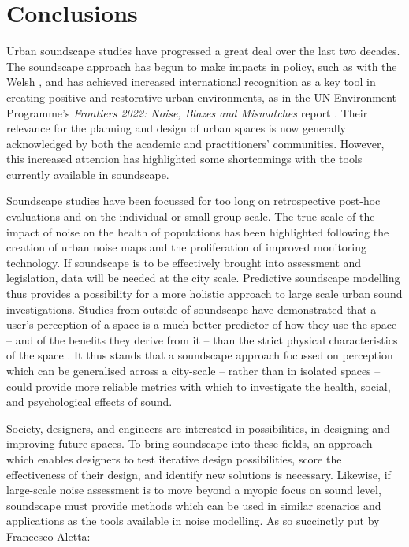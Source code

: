 \chapter{Conclusions}
\label{ch:conc}

Urban soundscape studies have progressed a great deal over the last two decades. The soundscape approach has begun to make impacts in policy, such as with the Welsh \citet{Welsh2018Noise}, and has achieved increased international recognition as a key tool in creating positive and restorative urban environments, as in the UN Environment Programme's \emph{Frontiers 2022: Noise, Blazes and Mismatches} report \citep{Aletta2022Frontiers}. Their relevance for the planning and design of urban spaces is now generally acknowledged by both the academic and practitioners' communities. However, this increased attention has highlighted some shortcomings with the tools currently available in soundscape. 

Soundscape studies have been focussed for too long on retrospective post-hoc evaluations and on the individual or small group scale. The true scale of the impact of noise on the health of populations has been highlighted following the creation of urban noise maps and the proliferation of improved monitoring technology. If soundscape is to be effectively brought into assessment and legislation, data will be needed at the city scale.  Predictive soundscape modelling thus provides a possibility for a more holistic approach to large scale urban sound investigations. Studies from outside of soundscape have demonstrated that a user's perception of a space is a much better predictor of how they use the space -- and of the benefits they derive from it -- than the strict physical characteristics of the space \citep{Kruize2019Exploring}. It thus stands that a soundscape approach focussed on perception which can be generalised across a city-scale -- rather than in isolated spaces -- could provide more reliable metrics with which to investigate the health, social, and psychological effects of sound.

Society, designers, and engineers are interested in possibilities, in designing and improving future spaces. To bring soundscape into these fields, an approach which enables designers to test iterative design possibilities, score the effectiveness of their design, and identify new solutions is necessary. Likewise, if large-scale noise assessment is to move beyond a myopic focus on sound level, soundscape must provide methods which can be used in similar scenarios and applications as the tools available in noise modelling. As so succinctly put by Francesco Aletta:

